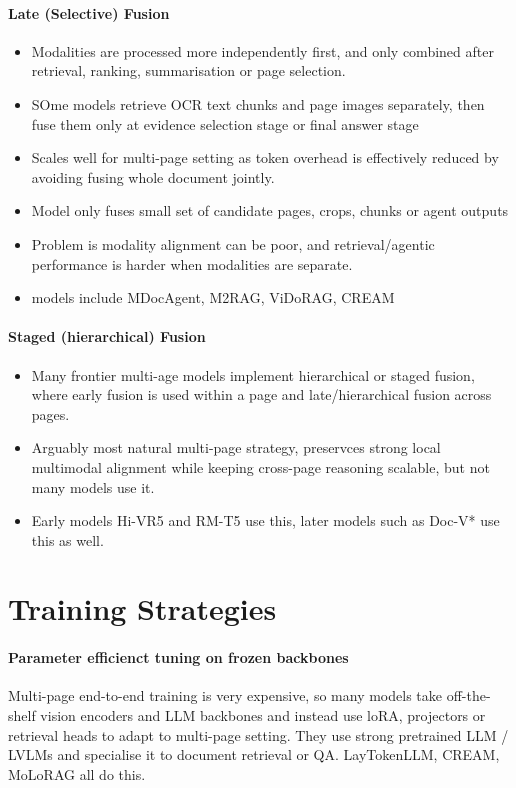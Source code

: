 \documentclass[11pt]{article}
\begin{document}
\paragraph{Late (Selective) Fusion}
\begin{itemize}
    \item Modalities are processed more independently first, and only combined after retrieval, ranking, summarisation or page selection. 
    \item SOme models retrieve OCR text chunks and page images separately, then fuse them only at evidence selection stage or final answer stage
    \item Scales well for multi-page setting as token overhead is effectively reduced by avoiding fusing whole document jointly.
    \item Model only fuses small set of candidate pages, crops, chunks or agent outputs
    \item Problem is modality alignment can be poor, and retrieval/agentic performance is harder when modalities are separate.
    \item models include MDocAgent, M2RAG, ViDoRAG, CREAM
\end{itemize}

\paragraph{Staged (hierarchical) Fusion}
\begin{itemize}
    \item Many frontier multi-age models implement hierarchical or staged fusion, where early fusion is used within a page and late/hierarchical fusion across pages. 
    \item Arguably most natural multi-page strategy, preservces strong local multimodal alignment while keeping cross-page reasoning scalable, but not many models use it.
    \item Early models Hi-VR5 and RM-T5 use this, later models such as Doc-V* use this as well.
\end{itemize}

\section{Training Strategies}

\paragraph{Parameter efficienct tuning on frozen backbones}
Multi-page end-to-end training is very expensive, so many models take off-the-shelf vision encoders and LLM backbones and instead use loRA, projectors or retrieval heads to adapt to multi-page setting. They use strong pretrained LLM / LVLMs and specialise it to document retrieval or QA. 
LayTokenLLM, CREAM, MoLoRAG all do this.
\end{document}
